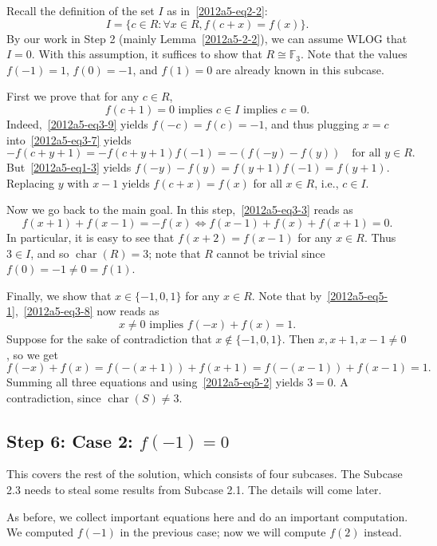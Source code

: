 \documentclass{article}
\newcommand{\F}{\mathbb{F}}
\DeclareMathOperator{\rchar}{char}
\begin{document}
Recall the definition of the set $I$ as in~\eqref{2012a5-eq2-2}:
\[ I = \{c \in R : \forall x \in R, f(c + x) = f(x)\}. \]
By our work in Step 2 (mainly Lemma~\ref{2012a5-2-2}), we can assume WLOG that $I = 0$.
With this assumption, it suffices to show that $R \cong \F_3$.
Note that the values $f(-1) = 1$, $f(0) = -1$, and $f(1) = 0$ are already known in this subcase.

First we prove that for any $c \in R$,
\[ f(c + 1) = 0 \text{ implies } c \in I \text{ implies } c = 0. \tag{5.1}\label{2012a5-eq5-1} \]
Indeed,~\eqref{2012a5-eq3-9} yields $f(-c) = f(c) = -1$, and thus plugging $x = c$ into~\eqref{2012a5-eq3-7} yields
\[ -f(c + y + 1) = -f(c + y + 1) f(-1) = -(f(-y) - f(y)) \quad \text{for all } y \in R. \]
But~\eqref{2012a5-eq1-3} yields $f(-y) - f(y) = f(y + 1) f(-1) = f(y + 1)$.
Replacing $y$ with $x - 1$ yields $f(c + x) = f(x)$ for all $x \in R$, i.e., $c \in I$.

Now we go back to the main goal.
In this step,~\eqref{2012a5-eq3-3} reads as
\[ f(x + 1) + f(x - 1) = -f(x) \iff f(x - 1) + f(x) + f(x + 1) = 0. \tag{5.2}\label{2012a5-eq5-2} \]
In particular, it is easy to see that $f(x + 2) = f(x - 1)$ for any $x \in R$.
Thus $3 \in I$, and so $\rchar(R) = 3$; note that $R$ cannot be trivial since $f(0) = -1 \neq 0 = f(1)$.

Finally, we show that $x \in \{-1, 0, 1\}$ for any $x \in R$.
Note that by~\eqref{2012a5-eq5-1},~\eqref{2012a5-eq3-8} now reads as
\[ x \neq 0 \text{ implies } f(-x) + f(x) = 1. \tag{5.3}\label{2012a5-eq5-3} \]
Suppose for the sake of contradiction that $x \notin \{-1, 0, 1\}$.
Then $x, x + 1, x - 1 \neq 0$, so we get
\[ f(-x) + f(x) = f(-(x + 1)) + f(x + 1) = f(-(x - 1)) + f(x - 1) = 1. \]
Summing all three equations and using~\eqref{2012a5-eq5-2} yields $3 = 0$.
A contradiction, since $\rchar(S) \neq 3$.









\subsection*{Step 6: Case 2: $f(-1) = 0$}

This covers the rest of the solution, which consists of four subcases.
The Subcase 2.3 needs to steal some results from Subcase 2.1.
The details will come later.

As before, we collect important equations here and do an important computation.
We computed $f(-1)$ in the previous case; now we will compute $f(2)$ instead.
\end{document}
